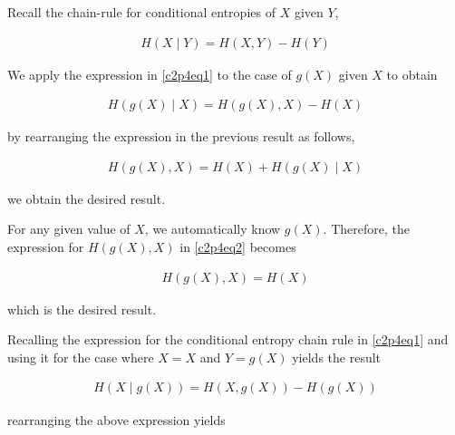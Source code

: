 \documentclass[ClusteringConnectionsMAIN.tex]{subfiles}
\begin{document}
	
	
  Recall the chain-rule for conditional entropies of $X$ given $Y$,

\begin{align}  \label{c2p4eq1}
H \left( X \mid Y \right) = H \left( X, Y \right) - H \left( Y \right)  \tag{2.4-1}
\end{align}

We apply the expression in \ref{c2p4eq1} to the case of $g \left( X \right)$ given $X$ to obtain

\begin{align} 
H \left( g \left( X \right) \mid X \right) = H \left( g \left( X \right), X \right) - H \left( X \right) 
\end{align}

by rearranging the expression in the previous result as follows,

\begin{align} \label{c2p4eq2} 
H \left( g \left( X \right), X \right) = H \left( X \right) + H \left( g \left( X \right) \mid X \right)  \tag{2.4-2}
\end{align}

we obtain the desired result.



\vspace{0.5in}

  For any given value of $X$, we automatically know $g \left( X \right)$.  Therefore, the expression for $H \left( g \left( X \right), X \right)$ in \ref{c2p4eq2} becomes

\begin{align*} 
H \left( g \left( X \right), X \right) = H \left( X \right)  
\end{align*}

which is the desired result.



\vspace{0.5in}

  Recalling the expression for the conditional entropy chain rule in \ref{c2p4eq1} and using it for the case where $X = X$ and $Y = g \left( X \right)$ yields the result

\begin{align*} 
H \left( X \mid g \left( X \right) \right) = H \left( X, g \left( X \right) \right) - H \left( g \left( X \right) \right)  
\end{align*}

rearranging the above expression yields 
\end{document}
